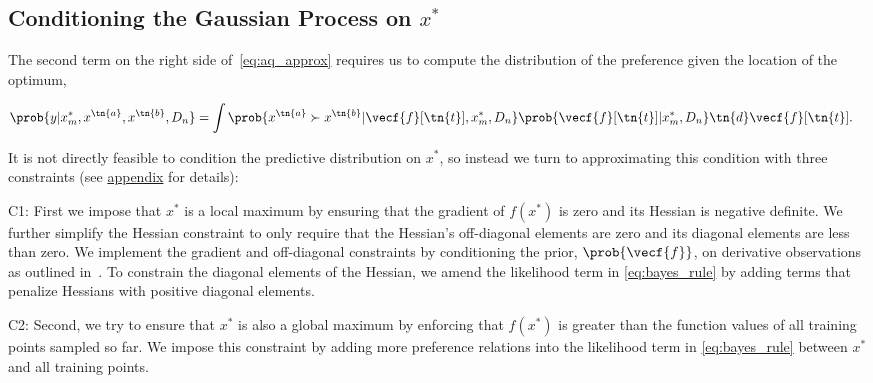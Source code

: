 \subsection[Conditioning the Gaussian Process on optima]{Conditioning the
Gaussian Process on $x^*$} The second term on the right side
of~\cref{eq:aq_approx} requires us to compute the distribution of the
preference given the location of the optimum,
\begin{fullwidth}
\begin{align}
&\prob{y| x_m^*, x^\tn{a}, x^\tn{b}, D_n} =
    \int \prob{x^\tn{a} \succ x^\tn{b} | \vecf{f}[\tn{t}], x_m^*, D_n} 
    \prob{\vecf{f}[\tn{t}] | x_m^*, D_n} \tn{d} \vecf{f}[\tn{t}].
    \label{eq:predic_pref_w_constraint}
\end{align}
\end{fullwidth}
It is not directly feasible to condition the predictive distribution on $x^*$,
so instead we turn to approximating this condition with three constraints (see
\hyperlink{sec:appendix}{appendix} for details):

C1: First we impose that $x^*$ is a local maximum by ensuring that the gradient
of $f(x^*)$ is zero and its Hessian is negative definite. We further simplify
the Hessian constraint to only require that the Hessian's off-diagonal elements
are zero and its diagonal elements are less than zero. We implement the gradient
and off-diagonal constraints by conditioning the prior, $\prob{\vecf{f}}$, on
derivative observations as outlined in~\citep{solak2003derivative}. To constrain
the diagonal elements of the Hessian, we amend the likelihood term in
\cref{eq:bayes_rule} by adding terms that penalize Hessians with positive
diagonal elements.

C2: Second, we try to ensure that $x^*$ is also a global maximum by enforcing
that $f(x^*)$ is greater than the function values of all training points sampled
so far. We impose this constraint by adding more preference relations into the
likelihood term in \cref{eq:bayes_rule} between $x^*$ and all training points.


